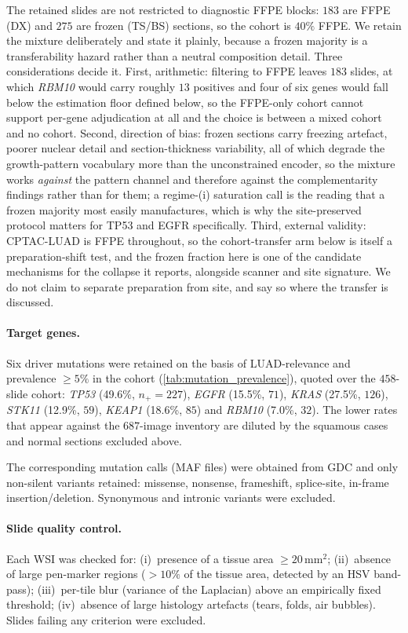 The retained slides are not restricted to diagnostic FFPE blocks:
$183$ are FFPE (DX) and $275$ are frozen (TS/BS) sections, so the
cohort is $40\%$ FFPE. We retain the mixture deliberately and state it
plainly, because a frozen majority is a transferability hazard rather
than a neutral composition detail. Three considerations decide it.
First, arithmetic: filtering to FFPE leaves $183$ slides, at which
\textit{RBM10} would carry roughly $13$ positives and four of six genes
would fall below the estimation floor defined below, so the
FFPE-only cohort cannot support per-gene adjudication at all and the
choice is between a mixed cohort and no cohort.
Second, direction of bias: frozen sections carry freezing artefact,
poorer nuclear detail and section-thickness variability, all of which
degrade the growth-pattern vocabulary more than the unconstrained
encoder, so the mixture works \emph{against} the pattern channel and
therefore against the complementarity findings rather than for them; a
regime-(i) saturation call is the reading that a frozen majority most
easily manufactures, which is why the site-preserved protocol matters
for TP53 and EGFR specifically.
Third, external validity: CPTAC-LUAD is FFPE throughout, so the
cohort-transfer arm below is itself a preparation-shift test, and the
frozen fraction here is one of the candidate mechanisms for the
collapse it reports, alongside scanner and site signature. We do not
claim to separate preparation from site, and say so where the
transfer is discussed.

\paragraph{Target genes.}
Six driver mutations were retained on the basis of
LUAD-relevance and prevalence $\geq 5\%$ in the cohort
(\cref{tab:mutation_prevalence}), quoted over the $458$-slide cohort:
\textit{TP53} (49.6\%, $n_+\!=\!227$), \textit{EGFR}
(15.5\%, $71$), \textit{KRAS} (27.5\%, $126$), \textit{STK11}
(12.9\%, $59$), \textit{KEAP1} (18.6\%, $85$) and
\textit{RBM10} (7.0\%, $32$). The lower rates that appear against the
$687$-image inventory are diluted by the squamous cases and normal
sections excluded above.

The corresponding mutation calls (MAF files) were obtained from
GDC and only non-silent variants retained: missense, nonsense,
frameshift, splice-site, in-frame insertion/deletion.
Synonymous and intronic variants were excluded.

\paragraph{Slide quality control.}
Each WSI was checked for: (i)~presence of a tissue area
$\geq 20\,\text{mm}^{2}$; (ii)~absence of large pen-marker
regions ($>10\%$ of the tissue area, detected by an HSV
band-pass); (iii)~per-tile blur (variance of the Laplacian)
above an empirically fixed threshold; (iv)~absence of large
histology artefacts (tears, folds, air bubbles).
Slides failing any criterion were excluded.

